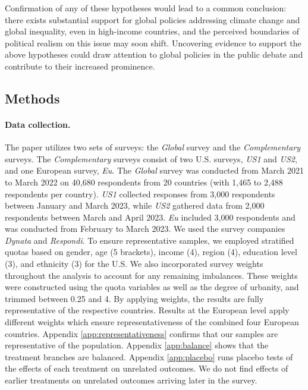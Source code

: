 Confirmation of any of these hypotheses would lead to a common conclusion: there exists substantial support for global policies addressing climate change and global inequality, even in high-income countries, and the perceived boundaries of political realism on this issue may soon shift. %
Uncovering evidence to support the above hypotheses could %
draw attention to global policies in the public debate and contribute to their increased prominence. %
  \begin{small} %
\section*{\normalsize Methods}\label{sec:methods} %
\paragraph{\small Data collection.} %

The paper utilizes two sets of surveys: the \textit{Global} survey and the \textit{Complementary} surveys. The \textit{Complementary} surveys consist of two U.S. surveys, \textit{US1} and \textit{US2}, and one European survey, \textit{Eu}. The \textit{Global} survey was conducted from March 2021 to March 2022 on 40,680 respondents from 20 countries (with 1,465 to 2,488 respondents per country). \textit{US1} collected responses from 3,000 respondents between January and March 2023, while \textit{US2} gathered data from 2,000 respondents between March and April 2023. \textit{Eu} included 3,000 respondents and was conducted from February to March 2023. We used the survey companies \emph{Dynata} and \emph{Respondi}. To ensure representative samples, we employed stratified quotas based on gender, age (5 brackets), income (4), region (4), education level (3), and ethnicity (3) for the U.S. We also incorporated survey weights throughout the analysis to account for any remaining imbalances. These weights were constructed using the quota variables as well as the degree of urbanity, and trimmed between 0.25 and 4. By applying weights, the results are fully representative of the respective countries. Results at the European level apply different weights which ensure  representativeness of the combined four European countries. Appendix \ref{app:representativeness} confirms that our samples are representative of the population. %
Appendix \ref{app:balance} shows that the treatment branches are balanced. Appendix \ref{app:placebo} runs placebo tests of the effects of each treatment on unrelated outcomes. We do not find effects of earlier treatments on unrelated outcomes arriving later in the survey.

\end{small}
